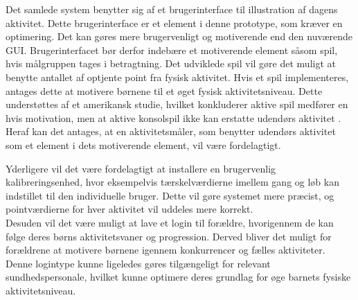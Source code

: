 Det samlede system benytter sig af et brugerinterface til illustration af dagens aktivitet. Dette brugerinterface er et element i denne prototype, som kræver en optimering. Det kan gøres mere brugervenligt og motiverende end den nuværende GUI. Brugerinterfacet bør derfor indebære et motiverende element såsom spil, hvis målgruppen tages i betragtning. Det udviklede spil vil gøre det muligt at benytte antallet af optjente point fra fysisk aktivitet. Hvis et spil implementeres, antages dette at motivere børnene til et øget fysisk aktivitetsniveau. Dette understøttes af et amerikansk studie, hvilket konkluderer aktive spil medfører en hvis motivation, men at aktive konsolspil ikke kan erstatte udendørs aktivitet \citep{Oestergaard2012}. Heraf kan det antages, at en aktivitetsmåler, som benytter udendørs aktivitet som et element i dets motiverende element, vil være fordelagtigt.

Yderligere vil det være fordelagtigt at installere en brugervenlig kalibreringsenhed, hvor eksempelvis tærskelværdierne imellem gang og løb kan indstillet til den individuelle bruger. Dette vil gøre systemet mere præcist, og pointværdierne for hver aktivitet vil uddeles mere korrekt. \\
Desuden vil det være muligt at lave et login til forældre, hvorigennem de kan følge deres børns aktivitetsvaner og progression. Derved bliver det muligt for forældrene at motivere børnene igennem konkurrencer og fælles aktiviteter. Denne logintype kunne ligeledes gøres tilgængeligt for relevant sundhedspersonale, hvilket kunne optimere deres grundlag for øge barnets fysiske aktivitetsniveau.